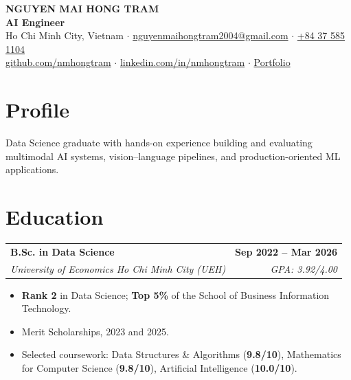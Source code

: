 \documentclass[a4paper,10pt]{article}
\makeatletter
\newcommand{\cvitem}{\itemsep0.55mm\parskip0pt\parsep0pt}
\newcommand{\bulletliststart}{\begin{itemize}[leftmargin=4.2mm,label=\raisebox{0.2ex}{\tiny$\bullet$},topsep=1.1mm] \cvitem}
\newcommand{\bulletlistend}{\end{itemize}\vspace{0.45mm}}
\newcommand{\entry}[4]{%
  \par\noindent
  \begin{tabularx}{\textwidth}{@{}Xr@{}}
    \textbf{#1} & \textbf{#2} \\
    \textit{#3} & \textit{#4}
  \end{tabularx}
  \par\vspace{0.4mm}
}
\newcommand{\email}{nguyenmaihongtram2004@gmail.com}
\newcommand{\phone}{+84 37 585 1104}
\newcommand{\github}{nmhongtram}
\newcommand{\linkedin}{nmhongtram}
\newcommand{\portfolio}{https://nmhongtram.github.io/engineer/}
\makeatother
\begin{document}
\selectfont

\begin{center}
  {\LARGE\bfseries NGUYEN MAI HONG TRAM}\\[1.2mm]
  {\large\bfseries\color{accent}
    AI Engineer}\\[1.8mm]
  {\small
    \faMapMarker\hspace{0.8mm}Ho Chi Minh City, Vietnam
    \hspace{1.4mm}$\cdot$\hspace{1.4mm}
    \href{mailto:\email}{\faEnvelope\hspace{0.8mm}\email}
    \hspace{1.4mm}$\cdot$\hspace{1.4mm}
    \href{tel:+84375851104}{\faPhone\hspace{0.8mm}\phone}\\[0.8mm]
    \href{https://github.com/\github}{\faGithub\hspace{0.8mm}github.com/\github}
    \hspace{1.4mm}$\cdot$\hspace{1.4mm}
    \href{https://www.linkedin.com/in/\linkedin/}{\faLinkedinSquare\hspace{0.8mm}linkedin.com/in/\linkedin}
    \hspace{1.4mm}$\cdot$\hspace{1.4mm}
    \href{\portfolio}{\faGlobe\hspace{0.8mm}Portfolio}
  }
\end{center}
\vspace{0.2mm}

\section{Profile}
\vspace{1.2mm}
\justifying
Data Science graduate with hands-on experience building and evaluating multimodal AI systems, vision--language pipelines, and production-oriented ML applications.
\vspace{1.5mm}

\section{Education}
\entry
  {B.Sc. in Data Science}
  {Sep 2022 -- Mar 2026}
  {University of Economics Ho Chi Minh City (UEH)}
  {GPA: 3.92/4.00}
\bulletliststart
  \item \textbf{Rank 2} in Data Science; \textbf{Top 5\%} of the School of Business Information Technology.
  \item Merit Scholarships, 2023 and 2025.
  \item Selected coursework: Data Structures \& Algorithms (\textbf{9.8/10}), Mathematics for Computer Science (\textbf{9.8/10}), Artificial Intelligence (\textbf{10.0/10}).
\bulletlistend
\end{document}
